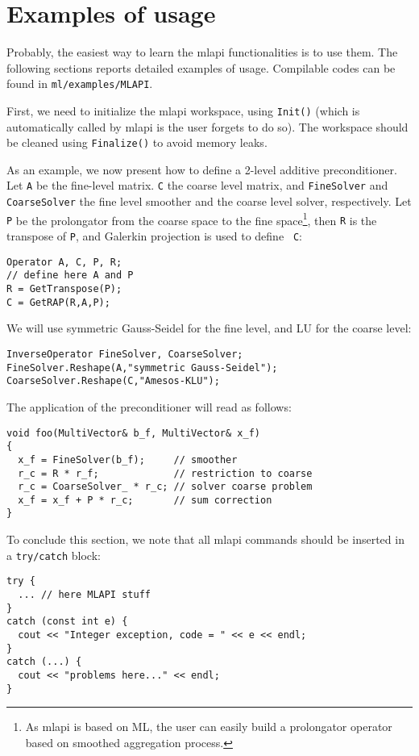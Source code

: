 \documentclass{article}[11pt]
\newcommand{\MLAPI}  {{\sc mlapi }}
\begin{document}
\section{Examples of usage}
\label{sec:example}

Probably, the easiest way to learn the \MLAPI functionalities is to use them.
The following sections reports detailed examples of usage. Compilable codes
can be found in \verb!ml/examples/MLAPI!.

First, we need to initialize the \MLAPI workspace, using {\tt Init()} 
(which is automatically called by \MLAPI is the user forgets to do so). The
workspace should be cleaned using {\tt Finalize()} to avoid memory leaks.

As an example, we now present how to define a 2-level additive
preconditioner. Let {\tt A} be the fine-level matrix.
{\tt C}  the coarse level matrix,
and {\tt FineSolver} and {\tt CoarseSolver} 
the fine level smoother and the coarse level solver,
respectively. Let {\tt P} be the prolongator from the coarse space to the fine
space\footnote{As \MLAPI is based on ML, the user can easily build a
  prolongator operator based on smoothed aggregation process.}, then {\tt R}
  is the transpose of {\tt P}, and Galerkin projection is used to define {\tt
    C}:
\begin{verbatim}
Operator A, C, P, R;
// define here A and P
R = GetTranspose(P);
C = GetRAP(R,A,P);
\end{verbatim} 
We will use symmetric Gauss-Seidel
for the fine level, and LU for the coarse level:
\begin{verbatim}
InverseOperator FineSolver, CoarseSolver;
FineSolver.Reshape(A,"symmetric Gauss-Seidel");
CoarseSolver.Reshape(C,"Amesos-KLU");
\end{verbatim}
The application of the preconditioner will read as follows:
\begin{verbatim}
void foo(MultiVector& b_f, MultiVector& x_f)
{
  x_f = FineSolver(b_f);     // smoother
  r_c = R * r_f;             // restriction to coarse
  r_c = CoarseSolver_ * r_c; // solver coarse problem
  x_f = x_f + P * r_c;       // sum correction
}
\end{verbatim}

\bigskip

To conclude this section, we note that all \MLAPI commands should be inserted
in a {\tt try/catch} block:
\begin{verbatim}
try {
  ... // here MLAPI stuff
}
catch (const int e) {
  cout << "Integer exception, code = " << e << endl;
} 
catch (...) {
  cout << "problems here..." << endl;
}
\end{verbatim}


\end{document}
